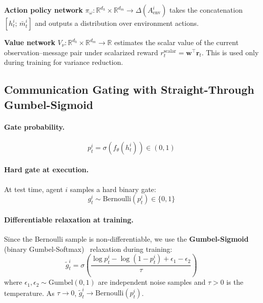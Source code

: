 \documentclass[runningheads]{llncs}
\newcommand{\R}{\mathbb{R}}
\newcommand{\bw}{\mathbf{w}}
\newcommand{\br}{\mathbf{r}}
\begin{document}
\textbf{Action policy network} $\pi_\omega: \R^{d_h} \times \R^{d_m} \to \Delta(A^i_\text{env})$
takes the concatenation $[h^i_t;\, \bar{m}^i_t]$ and outputs a
distribution over environment actions.

\textbf{Value network} $V_\nu: \R^{d_h} \times \R^{d_m} \to \R$
estimates the scalar value of the current observation--message pair
under scalarized reward $r^\text{scalar}_t = \bw^\top \br_t$.
This is used only during training for variance reduction.

\subsection{Communication Gating with Straight-Through Gumbel-Sigmoid}
\label{sec:gating}

\paragraph{Gate probability.}
\begin{equation}
  p^i_t = \sigma(f_\theta(h^i_t)) \in (0,1)
  \label{eq:gate_prob}
\end{equation}

\paragraph{Hard gate at execution.}
At test time, agent $i$ samples a hard binary gate:
\begin{equation}
  g^i_t \sim \text{Bernoulli}(p^i_t) \in \{0,1\}
  \label{eq:hard_gate}
\end{equation}

\paragraph{Differentiable relaxation at training.}
Since the Bernoulli sample is non-differentiable, we use the
\textbf{Gumbel-Sigmoid} (binary Gumbel-Softmax)~\cite{jang2017categorical,
maddison2017concrete} relaxation during training:
\begin{equation}
  \tilde{g}^i_t = \sigma\!\left(\frac{\log p^i_t - \log(1-p^i_t) + \epsilon_1 - \epsilon_2}{\tau}\right)
  \label{eq:gumbel_sigmoid}
\end{equation}
where $\epsilon_1, \epsilon_2 \sim \text{Gumbel}(0,1)$ are independent
noise samples and $\tau > 0$ is the temperature.
As $\tau \to 0$, $\tilde{g}^i_t \to \text{Bernoulli}(p^i_t)$.
\end{document}
